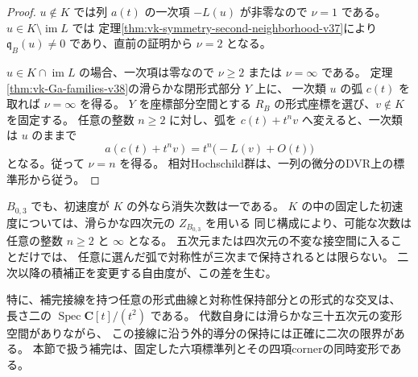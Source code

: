 \begin{proof}
$u\notin K$ では列 $a(t)$ の一次項 $-L(u)$ が非零なので $\nu=1$ である。
$u\in K\setminus\operatorname{im}L$ では
定理\ref{thm:vk-symmetry-second-neighborhood-v37}により
$\mathfrak q_B(u)\ne0$ であり、直前の証明から $\nu=2$ となる。

$u\in K\cap\operatorname{im}L$ の場合、一次項は零なので $\nu\ge2$ または
$\nu=\infty$ である。
定理\ref{thm:vk-Ga-families-v38}の滑らかな閉形式部分 $Y$ 上に、
一次類 $u$ の弧 $c(t)$ を取れば $\nu=\infty$ を得る。
$Y$ を座標部分空間とする $R_B$ の形式座標を選び、$v\notin K$ を固定する。
任意の整数 $n\ge2$ に対し、弧を $c(t)+t^n v$ へ変えると、一次類は $u$ のままで
\[
 a(c(t)+t^nv)=t^n\bigl(-L(v)+O(t)\bigr)
\]
となる。従って $\nu=n$ を得る。
相対Hochschild群は、一列の微分のDVR上の標準形から従う。
\end{proof}

$B_{0,3}$ でも、初速度が $K$ の外なら消失次数は一である。
$K$ の中の固定した初速度については、滑らかな四次元の $Z_{B_{0,3}}$ を用いる
同じ構成により、可能な次数は任意の整数 $n\ge2$ と $\infty$ となる。
五次元または四次元の不変な接空間に入ることだけでは、
任意に選んだ弧で対称性が三次まで保持されるとは限らない。
二次以降の積補正を変更する自由度が、この差を生む。

特に、補完接線を持つ任意の形式曲線と対称性保持部分との形式的な交叉は、
長さ二の $\operatorname{Spec}\mathbf C[t]/(t^2)$ である。
代数自身には滑らかな三十五次元の変形空間がありながら、
この接線に沿う外的導分の保持には正確に二次の限界がある。
本節で扱う補完は、固定した六項標準列とその四項cornerの同時変形である。
